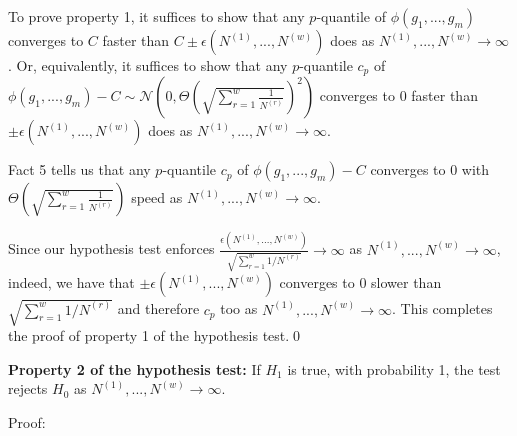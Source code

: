 \documentclass{article}
\begin{document}
To prove property 1, it suffices to show that any $\displaystyle p$-quantile of $\displaystyle \phi \left( g_{1} ,...,g_{m}\right)$ converges to $\displaystyle C$ faster than $\displaystyle C\pm \epsilon \left( N^{\left( 1\right)} ,...,N^{\left( w\right)}\right)$ does as $\displaystyle N^{\left( 1\right)} ,...,N^{\left( w\right)}\rightarrow \infty $. Or, equivalently, it suffices to show that any $\displaystyle p$-quantile $\displaystyle c_{p}$ of $\displaystyle \phi \left( g_{1} ,...,g_{m}\right) -C\sim \mathcal{N}\left( 0,\Theta \left(\sqrt{\sum _{r=1}^{w}\frac{1}{N^{\left( r\right)}}}\right)^{2}\right)$ converges to 0 faster than $\displaystyle \pm \epsilon \left( N^{\left( 1\right)} ,...,N^{\left( w\right)}\right)$ does as $\displaystyle N^{\left( 1\right)} ,...,N^{\left( w\right)}\rightarrow \infty $.

Fact 5 tells us that any $\displaystyle p$-quantile $\displaystyle c_{p}$ of $\displaystyle \phi \left( g_{1} ,...,g_{m}\right) -C$ converges to 0 with $\displaystyle \Theta \left(\sqrt{\sum _{r=1}^{w}\frac{1}{N^{\left( r\right)}}}\right)$ speed as $\displaystyle N^{\left( 1\right)} ,...,N^{\left( w\right)}\rightarrow \infty $.

Since our hypothesis test enforces $\displaystyle \frac{\epsilon \left( N^{\left( 1\right)} ,...,N^{\left( w\right)}\right)}{\sqrt{\sum _{r=1}^{w} 1/N^{\left( r\right)}}}\rightarrow \infty $ as $\displaystyle N^{\left( 1\right)} ,...,N^{\left( w\right)}\rightarrow \infty $, indeed, we have that $\displaystyle \pm \epsilon \left( N^{\left( 1\right)} ,...,N^{\left( w\right)}\right)$ converges to 0 slower than $\displaystyle \sqrt{\sum _{r=1}^{w} 1/N^{\left( r\right)}}$ and therefore $\displaystyle c_{p}$ too as $\displaystyle N^{\left( 1\right)} ,...,N^{\left( w\right)}\rightarrow \infty $. This completes the proof of property 1 of the hypothesis test.\qed 





\textbf{Property 2 of the hypothesis test: }If $\displaystyle H_{1}$ is true, with probability 1, the test rejects $\displaystyle H_{0}$ as $\displaystyle N^{\left( 1\right)} ,...,N^{\left( w\right)}\rightarrow \infty $.



Proof:
\end{document}
